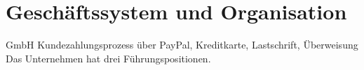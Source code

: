 \chapter{Geschäftssystem und Organisation}
\label{cha:5}
GmbH
Kundezahlungsprozess über PayPal, Kreditkarte, Lastschrift, Überweisung
Das Unternehmen hat drei Führungspositionen.